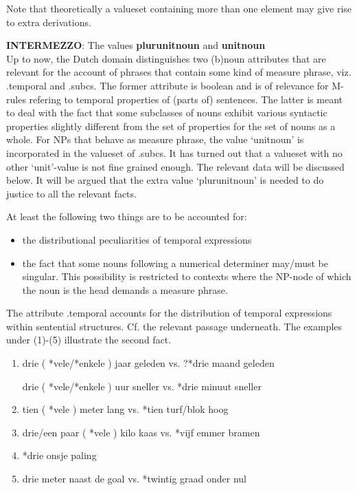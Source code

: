 \begin{description}
Note that theoretically a valueset containing more than
one element may give rise to extra derivations. 

{\bf INTERMEZZO}: The values {\bf plurunitnoun} and {\bf unitnoun}\\

Up to now, 
the Dutch domain distinguishes two (b)noun attributes that are relevant
for the account of phrases that contain some kind of measure phrase, viz.
.temporal and .subcs. The former attribute is boolean and is of relevance for
M-rules refering to temporal properties of (parts of) sentences. 
The latter is meant  to deal with the fact that some subclasses of nouns
exhibit various syntactic properties slightly different from the 
set of properties for the set of nouns as a whole. For NPs that behave as 
measure phrase, the 
value `unitnoun' is incorporated in the valueset of .subcs.
It has turned out that a valueset with no other `unit'-value 
is not fine grained enough.
The relevant data will be discussed below. It will 
be argued that the extra 
value `plurunitnoun' is needed to do justice to all the relevant facts.

At least the following two things are to be accounted for:
\begin{itemize}
\item the distributional peculiarities of temporal expressions
\item the fact that some nouns following a numerical determiner 
may/must  be singular. This possibility is restricted to contexts where the
NP-node of which the noun is the head demands a measure phrase. 
\end{itemize}

The attribute .temporal accounts for the distribution of temporal expressions
within sentential structures. Cf. the relevant passage underneath.
The examples under (1)-(5) illustrate the second fact. 
\begin{enumerate}
\item drie ( *vele/*enkele ) jaar geleden    vs. ?*drie maand geleden

      drie ( *vele/*enkele ) uur sneller     vs. *drie minuut sneller
\item tien ( *vele ) meter lang              vs. *tien turf/blok hoog
\item drie/een paar ( *vele ) kilo kaas      vs. *vijf emmer bramen
\item *drie onsje paling
\item drie meter naast de goal               vs. *twintig graad onder nul      
      

\end{enumerate}
\end{description}

